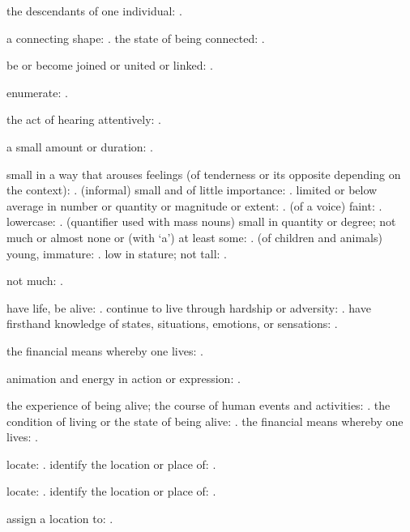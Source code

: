   the descendants of one individual: .

  a connecting shape: . the state of being connected: .

  be or become joined or united or linked: .

  enumerate: .

  the act of hearing attentively: .

  a small amount or duration: .

  small in a way that arouses feelings (of tenderness or its opposite depending on the context): . (informal) small and of little importance: . limited or below average in number or quantity or magnitude or extent: . (of a voice) faint: . lowercase: . (quantifier used with mass nouns) small in quantity or degree; not much or almost none or (with `a') at least some: . (of children and animals) young, immature: . low in stature; not tall: .

  not much: .

  have life, be alive: . continue to live through hardship or adversity: . have firsthand knowledge of states, situations, emotions, or sensations: .

  the financial means whereby one lives: .

  animation and energy in action or expression: .

  the experience of being alive; the course of human events and activities: . the condition of living or the state of being alive: . the financial means whereby one lives: .

  locate: . identify the location or place of: .

  locate: . identify the location or place of: .

  assign a location to: .

